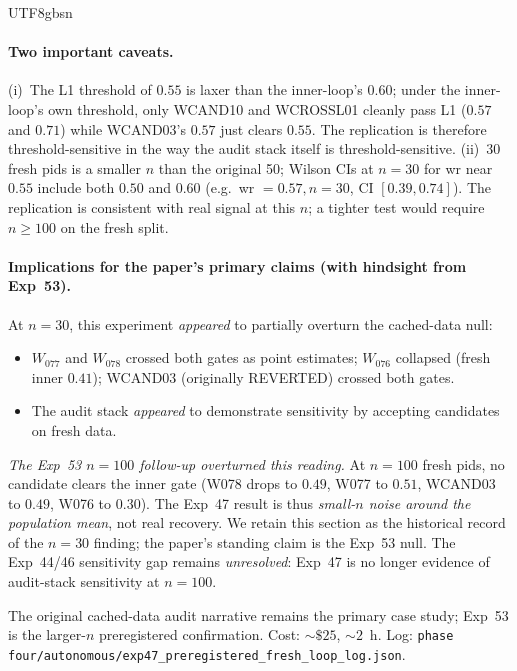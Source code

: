 \documentclass{article}
\begin{document}
\begin{CJK*}{UTF8}{gbsn}
\paragraph{Two important caveats.}
(i)~The L1 threshold of \(0.55\) is laxer than the inner-loop's
\(0.60\); under the inner-loop's own threshold, only WCAND10 and
WCROSSL01 cleanly pass L1 (\(0.57\) and \(0.71\)) while WCAND03's
\(0.57\) just clears \(0.55\). The replication is therefore
threshold-sensitive in the way the audit stack itself is
threshold-sensitive.
(ii)~30 fresh pids is a smaller \(n\) than the original 50;
Wilson CIs at \(n=30\) for wr near \(0.55\) include both
\(0.50\) and \(0.60\) (e.g.\ wr \(= 0.57, n=30\), CI
\([0.39, 0.74]\)). The replication is consistent with real
signal at this \(n\); a tighter test would require \(n \geq 100\)
on the fresh split.

\paragraph{Implications for the paper's primary claims (with
hindsight from Exp~53).} At \(n=30\), this experiment
\emph{appeared} to partially overturn the cached-data null:
\begin{itemize}[leftmargin=*,topsep=2pt,itemsep=2pt]
  \item \(W_{077}\) and \(W_{078}\) crossed both gates as point
    estimates; \(W_{076}\) collapsed (fresh inner \(0.41\));
    WCAND03 (originally REVERTED) crossed both gates.
  \item The audit stack \emph{appeared} to demonstrate
    sensitivity by accepting candidates on fresh data.
\end{itemize}
\emph{The Exp~53 \(n=100\) follow-up overturned this reading.}
At \(n=100\) fresh pids, no candidate clears the inner gate (W078
drops to \(0.49\), W077 to \(0.51\), WCAND03 to \(0.49\),
W076 to \(0.30\)). The Exp~47 result is thus \emph{small-\(n\)
noise around the population mean}, not real recovery. We retain
this section as the historical record of the \(n=30\) finding;
the paper's standing claim is the Exp~53 null. The Exp~44/46
sensitivity gap remains \emph{unresolved}: Exp~47 is no longer
evidence of audit-stack sensitivity at \(n=100\).

The original cached-data audit narrative remains the primary
case study; Exp~53 is the larger-\(n\) preregistered
confirmation. Cost: \({\sim}\$25\), \({\sim}2\)~h. Log:
\texttt{phase four/autonomous/exp47\_preregistered\_fresh\_loop\_log.json}.


\end{CJK*}
\end{document}

